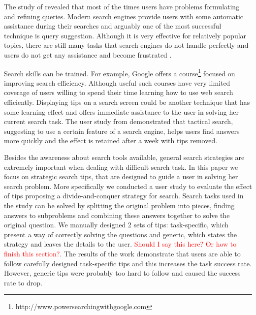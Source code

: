 \documentclass{sig-alternate}
\newcommand\todo[1]{\textcolor{red}{#1}}
\begin{document}
The study of \cite{xie2009understanding} revealed that most of the times users have problems formulating and refining queries.
Modern search engines provide users with some automatic assistance during their searches and arguably one of the most successful technique is query suggestion.
Although it is very effective for relatively popular topics, there are still many tasks that search engines do not handle perfectly and users do not get any assistance and become frustrated \cite{Feild:2010:PSF:1835449.1835458}.


Search skills can be trained. For example, Google offers a course\footnote{http://www.powersearchingwithgoogle.com} focused on improving search efficiency.
Although useful such courses have very limited coverage of users willing to spend their time learning how to use web search efficiently. 
Displaying tips on a search screen could be another technique that has some learning effect and offers immediate assistance to the user in solving her current search task.
The user study from \cite{Moraveji:2011:MIU:2009916.2009966} demonstrated that tactical search, suggesting to use a certain feature of a search engine, helps users find answers more quickly and the effect is retained after a week with tips removed.

Besides the awareness about search tools available, general search strategies are extremely important when dealing with difficult search task.
In this paper we focus on strategic search tips, that are designed to guide a user in solving her search problem.
More specifically we conducted a user study to evaluate the effect of tips proposing a divide-and-conquer strategy for search.
Search tasks used in the study can be solved by splitting the original problem into pieces, finding answers to subproblems and combining these answers together to solve the original question.
We manually designed 2 sets of tips: task-specific, which present a way of correctly solving the questions and generic, which states the strategy and leaves the details to the user.
\todo{Should I say this here? Or how to finish this section?}. The results of the work demonstrate that users are able to follow carefully designed task-specific tips and this increases the task success rate.
However, generic tips were probably too hard to follow and caused the success rate to drop.
\end{document}
